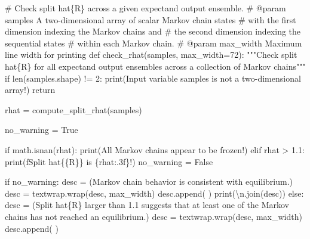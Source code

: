 \documentclass[
  letterpaper,
  DIV=11,
  numbers=noendperiod]{scrartcl}
\newenvironment{Shaded}{\begin{snugshade}}{\end{snugshade}}
\newcommand{\BuiltInTok}[1]{\textcolor[rgb]{0.00,0.23,0.31}{#1}}
\newcommand{\CharTok}[1]{\textcolor[rgb]{0.13,0.47,0.30}{#1}}
\newcommand{\CommentTok}[1]{\textcolor[rgb]{0.37,0.37,0.37}{#1}}
\newcommand{\ControlFlowTok}[1]{\textcolor[rgb]{0.00,0.23,0.31}{#1}}
\newcommand{\DecValTok}[1]{\textcolor[rgb]{0.68,0.00,0.00}{#1}}
\newcommand{\FloatTok}[1]{\textcolor[rgb]{0.68,0.00,0.00}{#1}}
\newcommand{\KeywordTok}[1]{\textcolor[rgb]{0.00,0.23,0.31}{#1}}
\newcommand{\NormalTok}[1]{\textcolor[rgb]{0.00,0.23,0.31}{#1}}
\newcommand{\OperatorTok}[1]{\textcolor[rgb]{0.37,0.37,0.37}{#1}}
\newcommand{\SpecialCharTok}[1]{\textcolor[rgb]{0.37,0.37,0.37}{#1}}
\newcommand{\SpecialStringTok}[1]{\textcolor[rgb]{0.13,0.47,0.30}{#1}}
\newcommand{\StringTok}[1]{\textcolor[rgb]{0.13,0.47,0.30}{#1}}
\newcommand{\VariableTok}[1]{\textcolor[rgb]{0.07,0.07,0.07}{#1}}
\begin{document}
\begin{Shaded}
\begin{Highlighting}[]

\CommentTok{\# Check split hat\{R\} across a given expectand output ensemble.}
\CommentTok{\# @param samples A two{-}dimensional array of scalar Markov chain states }
\CommentTok{\#                with the first dimension indexing the Markov chains and }
\CommentTok{\#                the second dimension indexing the sequential states }
\CommentTok{\#                within each Markov chain.}
\CommentTok{\# @param max\_width Maximum line width for printing}
\KeywordTok{def}\NormalTok{ check\_rhat(samples, max\_width}\OperatorTok{=}\DecValTok{72}\NormalTok{):}
  \CommentTok{"""Check split hat\{R\} for all expectand output ensembles across}
\CommentTok{     a collection of Markov chains"""}
  \ControlFlowTok{if} \BuiltInTok{len}\NormalTok{(samples.shape) }\OperatorTok{!=} \DecValTok{2}\NormalTok{:}
    \BuiltInTok{print}\NormalTok{(}\StringTok{\textquotesingle{}Input variable \textasciigrave{}samples\textasciigrave{} is not a two{-}dimensional array!\textquotesingle{}}\NormalTok{)}
    \ControlFlowTok{return}
    
\NormalTok{  rhat }\OperatorTok{=}\NormalTok{ compute\_split\_rhat(samples)}
  
\NormalTok{  no\_warning }\OperatorTok{=} \VariableTok{True}
  
  \ControlFlowTok{if}\NormalTok{ math.isnan(rhat):}
    \BuiltInTok{print}\NormalTok{(}\StringTok{\textquotesingle{}All Markov chains appear to be frozen!\textquotesingle{}}\NormalTok{)}
  \ControlFlowTok{elif}\NormalTok{ rhat }\OperatorTok{\textgreater{}} \FloatTok{1.1}\NormalTok{:}
    \BuiltInTok{print}\NormalTok{(}\SpecialStringTok{f\textquotesingle{}Split hat}\CharTok{\{\{}\SpecialStringTok{R}\CharTok{\}\}}\SpecialStringTok{ is }\SpecialCharTok{\{}\NormalTok{rhat}\SpecialCharTok{:.3f\}}\SpecialStringTok{!\textquotesingle{}}\NormalTok{)}
\NormalTok{    no\_warning }\OperatorTok{=} \VariableTok{False}
 
  \ControlFlowTok{if}\NormalTok{ no\_warning:}
\NormalTok{    desc }\OperatorTok{=}\NormalTok{ (}\StringTok{\textquotesingle{}Markov chain behavior is consistent with equilibrium.\textquotesingle{}}\NormalTok{)}
\NormalTok{    desc }\OperatorTok{=}\NormalTok{ textwrap.wrap(desc, max\_width)}
\NormalTok{    desc.append(}\StringTok{\textquotesingle{} \textquotesingle{}}\NormalTok{)}
    \BuiltInTok{print}\NormalTok{(}\StringTok{\textquotesingle{}}\CharTok{\textbackslash{}n}\StringTok{\textquotesingle{}}\NormalTok{.join(desc))}
  \ControlFlowTok{else}\NormalTok{:}
\NormalTok{    desc }\OperatorTok{=}\NormalTok{ (}\StringTok{\textquotesingle{}Split hat}\SpecialCharTok{\{R\}}\StringTok{ larger than 1.1 suggests that at least one \textquotesingle{}}
            \StringTok{\textquotesingle{}of the Markov chains has not reached an equilibrium.\textquotesingle{}}\NormalTok{)}
\NormalTok{    desc }\OperatorTok{=}\NormalTok{ textwrap.wrap(desc, max\_width)}
\NormalTok{    desc.append(}\StringTok{\textquotesingle{} \textquotesingle{}}\NormalTok{)}
\end{Highlighting}
\end{Shaded}
\end{document}
